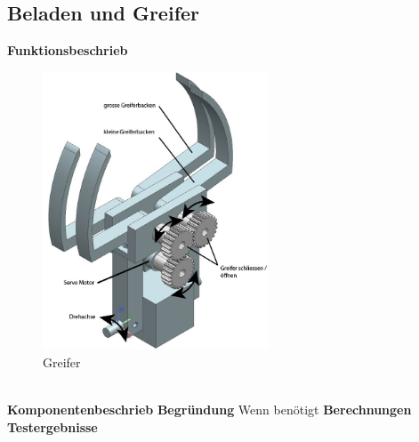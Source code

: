 \subsection{Beladen und Greifer}

\textbf{Funktionsbeschrieb}
\begin{figure}[h!]%
\centering
\includegraphics[width=0.6\textwidth]{03_Loesungskonzept/pictures/greifer2.jpg}
\caption{Greifer}
\label{fig:activityRoute}
\end{figure}\\
\textbf{Komponentenbeschrieb}
\textbf{Begründung}
Wenn benötigt
\textbf{Berechnungen}
\textbf{Testergebnisse}